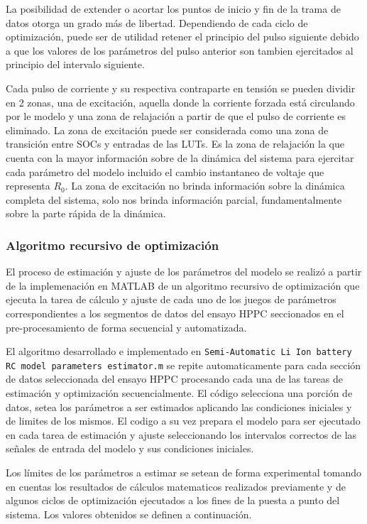 \documentclass[10pt,a4paper]{article}
\begin{document}
La posibilidad de extender o acortar los puntos de inicio y fin de la trama de
datos otorga un grado más de libertad. Dependiendo de cada ciclo de
optimización, puede ser de utilidad retener el principio del pulso siguiente
debido a que los valores de los parámetros del pulso anterior son tambien
ejercitados al principio del intervalo siguiente. 

Cada pulso de corriente y su respectiva contraparte en tensión se pueden dividir
en 2 zonas, una de excitación, aquella donde la corriente forzada está
circulando por le modelo y una zona de relajación a partir de que el pulso de
corriente es eliminado. La zona de excitación puede ser considerada como una
zona de transición entre \acrshort{SOC}s y entradas de las \acrshort{LUT}s.
Es la zona de relajación la que cuenta con la mayor información sobre de la
dinámica del sistema para ejercitar cada parámetro del modelo incluido el cambio
instantaneo de voltaje que representa $R_{0}$. La zona de excitación no 
brinda información sobre la dinámica completa del sistema, solo nos
brinda información parcial, fundamentalmente sobre la parte rápida de la
dinámica. 

\subsubsection{Algoritmo recursivo de optimizaci\'on}

El proceso de estimación y ajuste de los parámetros del modelo se realizó a
partir de la implemenación en MATLAB de un algoritmo recursivo de optimización
que ejecuta la tarea de cálculo y ajuste de cada uno de los juegos de parámetros
correspondientes a los segmentos de datos del ensayo \acrshort{HPPC} seccionados
en el pre-procesamiento de forma secuencial y automatizada.

El algoritmo desarrollado e implementado en \texttt{Semi-Automatic Li Ion
battery RC model parameters estimator.m} se repite automaticamente para cada
sección de datos seleccionada del ensayo \acrshort{HPPC} procesando cada una de
las tareas de estimación y optimización secuencialmente. El código selecciona
una porción de datos, setea los parámetros a ser estimados aplicando las
condiciones iniciales y de limites de los mismos. El codigo a su vez prepara el
modelo para ser ejecutado en cada tarea de estimación y ajuste seleccionando los
intervalos correctos de las señales de entrada del modelo y sus condiciones
iniciales.

Los límites de los parámetros a estimar se setean de forma experimental tomando
en cuentas los resultados de cálculos matematicos realizados previamente y de
algunos ciclos de optimización ejecutados a los fines de la puesta a punto del
sistema. Los valores obtenidos se definen a continuación. 
\end{document}
